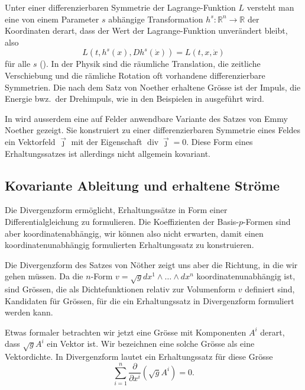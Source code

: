 Unter einer differenzierbaren Symmetrie der Lagrange-Funktion $L$
versteht man eine von einem
Parameter $s$ abhängige Transformation $h^s\colon \mathbb{R}^n\to \mathbb{R}$
der Koordinaten derart, dass der Wert der Lagrange-Funktion unverändert
bleibt, also
\[
L(t,h^s(x),Dh^s(\dot{x}))
=
L(t,x,\dot{x})
\]
für alle $s$ (\cite[Definition 10.4]{buch:seminarvariation}).
In der Physik sind die räumliche Translation, die zeitliche Verschiebung
und die rämliche Rotation oft vorhandene differenzierbare Symmetrien.
Die nach dem Satz von Noether erhaltene Grösse ist
der Impuls, die Energie bwz.~der Drehimpuls, wie in den Beispielen
in \cite[Abschnitt 10.2]{buch:seminarvariation} ausgeführt wird.

In \cite[Abschnitt 10.3]{buch:seminarvariation} wird ausserdem eine auf
Felder anwendbare Variante des Satzes von Emmy Noether gezeigt.
Sie konstruiert zu einer differenzierbaren Symmetrie eines Feldes
ein Vektorfeld $\vec{\jmath}$ mit der Eigenschaft
$\operatorname{div}\vec{\jmath}=0$.
Diese Form eines Erhaltungssatzes ist allerdings nicht allgemein
kovariant.

%
%
\subsection{Kovariante Ableitung und erhaltene Ströme
\label{buch:zusammenhang:divergenz:subsetion:kovariant}}
Die Divergenzform ermöglicht, Erhaltungssätze in Form einer 
Differentialgleichung zu formulieren.
Die Koeffizienten der Basis-$p$-Formen sind aber koordinatenabhängig,
wir können also nicht erwarten, damit einen koordinatenunabhängig
formulierten Erhaltungssatz zu konstruieren.

Die Divergenzform des Satzes von Nöther zeigt uns aber die Richtung,
in die wir gehen müssen.
Da die $n$-Form $v=\sqrt{g} dx^1\wedge \dots\wedge dx^n$
koordinatenunabhängig ist, sind Grössen, die als Dichtefunktionen
relativ zur Volumenform $v$ definiert sind, Kandidaten für Grössen,
für die ein Erhaltungssatz in Divergenzform formuliert werden kann.

Etwas formaler betrachten wir jetzt eine Grösse mit Komponenten $A^i$
derart, dass $\sqrt{g}A^i$ ein Vektor ist.
Wir bezeichnen eine solche Grösse als eine Vektordichte.
In Divergenzform lautet ein Erhaltungssatz für diese Grösse
\[
\sum_{i=1}^n \frac{\partial}{\partial x^i} (\!\sqrt{g}A^i)
=
0.
\]
